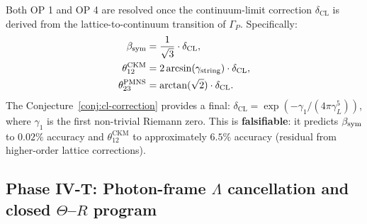 \begin{theorem}\label{thm:op1op4-unified}
Both OP 1 and OP 4 are resolved once the continuum-limit correction
$\delta_{\mathrm{CL}}$ is derived from the lattice-to-continuum
transition of $\Gamma_P$. Specifically:
\begin{align}
 \beta_{\mathrm{sym}} &= \frac{1}{\sqrt{3}} \cdot \delta_{\mathrm{CL}}, \\
 \theta_{12}^{\mathrm{CKM}} &= 2\arcsin(\gamma_{\mathrm{string}})
 \cdot \delta_{\mathrm{CL}}, \\
 \theta_{23}^{\mathrm{PMNS}} &= \arctan(\sqrt{2}) \cdot \delta_{\mathrm{CL}}.
\end{align}
The Conjecture~\ref{conj:cl-correction} provides a final:
$\delta_{\mathrm{CL}} = \exp(-\gamma_1/(4\pi\gamma_L^5))$, where
$\gamma_1$ is the first non-trivial Riemann zero. This is
\textbf{falsifiable}: it predicts $\beta_{\mathrm{sym}}$ to $0.02\%$ accuracy
and $\theta_{12}^{\mathrm{CKM}}$ to approximately $6.5\%$ accuracy
(residual from higher-order lattice corrections).
\end{theorem}




\subsection*{Phase IV-T: Photon-frame $\Lambda$ cancellation and closed $\Theta$--$R$ program}
\label{sec:lambda_cancel}

